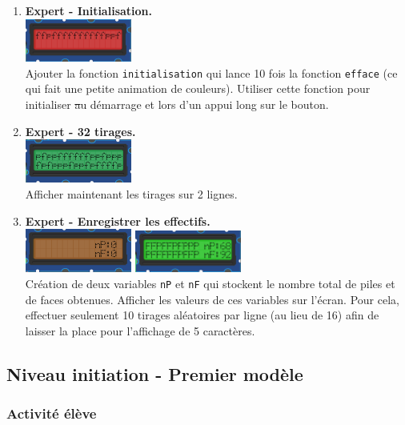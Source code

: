 \begin{methode}
\begin{enumerate}
    \item
        \textbf{Expert - Initialisation.} \\
        \includegraphics[width=3.5cm]{res/st-pf-02.png}\\Ajouter la fonction \texttt{initialisation} qui lance 10 fois la fonction \texttt{efface} (ce qui fait une petite animation de couleurs). Utiliser cette fonction pour initialiser \st au démarrage et lors d'un appui long sur le bouton.
    \item
        \textbf{Expert - 32 tirages.} \\
        \includegraphics[width=3.5cm]{res/st-pf-04.png}\\Afficher maintenant les tirages sur 2 lignes.
    \item
        \textbf{Expert - Enregistrer les effectifs.} \\
        \includegraphics[width=3.5cm]{res/st-pf-05-1.png} \quad
        \includegraphics[width=3.5cm]{res/st-pf-05-2.png}\\Création de deux variables \texttt{nP} et \texttt{nF} qui stockent le nombre total de piles et de faces obtenues. Afficher les valeurs de ces variables sur l'écran. Pour cela, effectuer seulement 10 tirages aléatoires par ligne (au lieu de 16) afin de laisser la place pour l'affichage de 5 caractères. 
\end{enumerate}
\end{methode}

%
%
\newpage
\subsection{Niveau initiation - Premier modèle }
\subsubsection{Activité élève}

